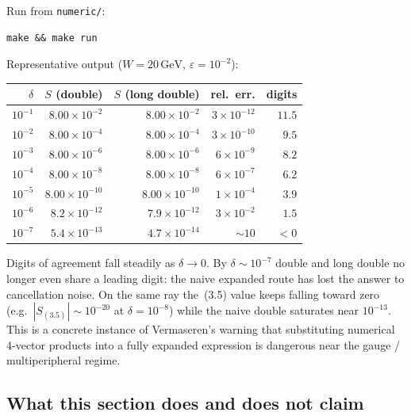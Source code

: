 \documentclass[11pt]{article}
\begin{document}
Run from \texttt{numeric/}:
\begin{verbatim}
make && make run
\end{verbatim}
Representative output ($W=20\,\mathrm{GeV}$, $\varepsilon=10^{-2}$):
\begin{center}
\begin{tabular}{@{}rrrrr@{}}
\toprule
$\delta$ & $S$ (double) & $S$ (long double) & rel.\ err. & digits \\
\midrule
$10^{-1}$ & $8.00\times10^{-2}$ & $8.00\times10^{-2}$ & $3\times10^{-12}$ & $11.5$ \\
$10^{-2}$ & $8.00\times10^{-4}$ & $8.00\times10^{-4}$ & $3\times10^{-10}$ & $9.5$ \\
$10^{-3}$ & $8.00\times10^{-6}$ & $8.00\times10^{-6}$ & $6\times10^{-9}$ & $8.2$ \\
$10^{-4}$ & $8.00\times10^{-8}$ & $8.00\times10^{-8}$ & $6\times10^{-7}$ & $6.2$ \\
$10^{-5}$ & $8.00\times10^{-10}$ & $8.00\times10^{-10}$ & $1\times10^{-4}$ & $3.9$ \\
$10^{-6}$ & $8.2\times10^{-12}$ & $7.9\times10^{-12}$ & $3\times10^{-2}$ & $1.5$ \\
$10^{-7}$ & $5.4\times10^{-13}$ & $4.7\times10^{-14}$ & $\sim 10$ & $<0$ \\
\bottomrule
\end{tabular}
\end{center}
Digits of agreement fall steadily as $\delta\to0$. By $\delta\sim10^{-7}$
double and long double no longer even share a leading digit: the naive
expanded route has lost the answer to cancellation noise. On the same
ray the~(3.5) value keeps falling toward zero (e.g.\ $|S_{(3.5)}|\sim10^{-20}$
at $\delta=10^{-8}$) while the naive double saturates near $10^{-13}$.
This is a concrete instance of Vermaseren's warning that substituting
numerical 4-vector products into a fully expanded expression is dangerous
near the gauge / multiperipheral regime.

\subsection{What this section does and does not claim}
\label{sec:numerics-claims}
\end{document}
